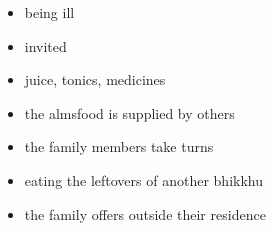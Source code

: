\begin{multicols}{2}

\begin{itemize}
\tightlist
\item
  being ill
\item
  invited
\item
  juice, tonics, medicines
\item
  the almsfood is supplied by others
\item
  the family members take turns
\item
  eating the leftovers of another bhikkhu
\item
  the family offers outside their residence
\end{itemize}

\end{multicols}

